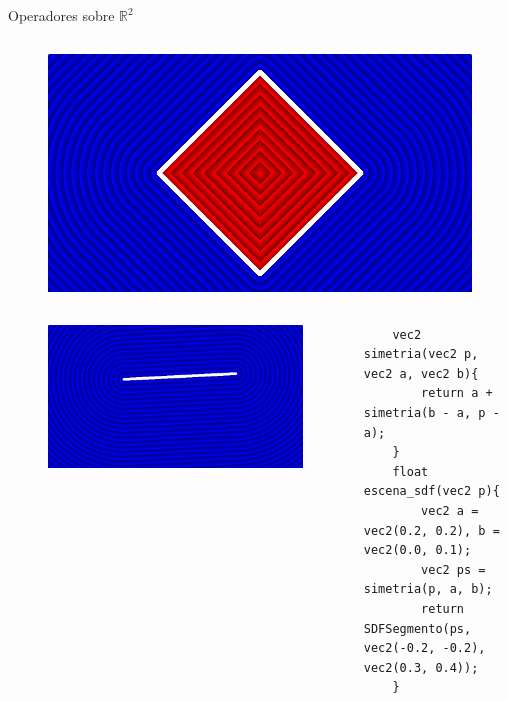 \begin{frame}[fragile]{Operadores sobre \(\mathbb{R}^2\)}
\begin{columns}[c, onlytextwidth]
        \column{1.5in}
            \begin{figure}[H]
              \centering
              \includegraphics[width=1.0\textwidth]{imagenes/sdf/2d/sdf_rotacion.png}
            \end{figure}
        
    \end{columns}
    
    \begin{columns}[c, onlytextwidth]
        \column{1.5in}
            \begin{figure}[H]
              \centering
              \includegraphics[width=1.0\textwidth]{imagenes/sdf/2d/sdf_simetria.png}
            \end{figure}
        
        \column{\dimexpr\paperwidth-10pt}
    \begin{lstlisting}
    vec2 simetria(vec2 p, vec2 a, vec2 b){
        return a + simetria(b - a, p - a);
    }
    float escena_sdf(vec2 p){
        vec2 a = vec2(0.2, 0.2), b = vec2(0.0, 0.1);
        vec2 ps = simetria(p, a, b);
        return SDFSegmento(ps, vec2(-0.2, -0.2), vec2(0.3, 0.4));
    }
            \end{lstlisting}
        
    \end{columns}

\end{frame}

